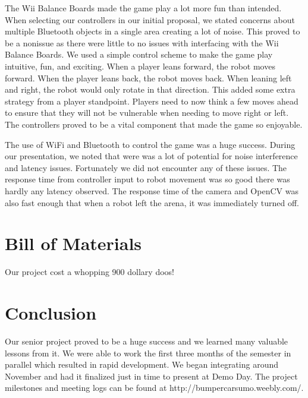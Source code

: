 \documentclass[11pt]{ieeeconf}
\begin{document}
The Wii Balance Boards made the game play a lot more fun than intended. When selecting our controllers in our initial proposal, we stated concerns about multiple Bluetooth objects in a single area creating a lot of noise. This proved to be a nonissue as there were little to no issues with interfacing with the Wii Balance Boards. We used a simple control scheme to make the game play intuitive, fun, and exciting. When a player leans forward, the robot moves forward. When the player leans back, the robot moves back. When leaning left and right, the robot would only rotate in that direction. This added some extra strategy from a player standpoint. Players need to now think a few moves ahead to ensure that they will not be vulnerable when needing to move right or left. The controllers proved to be a vital component that made the game so enjoyable.

The use of WiFi and Bluetooth to control the game was a huge success. During our presentation, we noted that were was a lot of potential for noise interference and latency issues. Fortunately we did not encounter any of these issues. The response time from controller input to robot movement was so good there was hardly any latency observed. The response time of the camera and OpenCV was also fast enough that when a robot left the arena, it was immediately turned off. 

\section{Bill of Materials}

Our project cost a whopping 900 dollary doos!

\section{Conclusion}

Our senior project proved to be a huge success and we learned many valuable lessons from it. We were able to work the first three months of the semester in parallel which resulted in rapid development. We began integrating around November and had it finalized just in time to present at Demo Day. The project milestones and meeting logs can be found at http://bumpercarsumo.weebly.com/.



\end{document}
